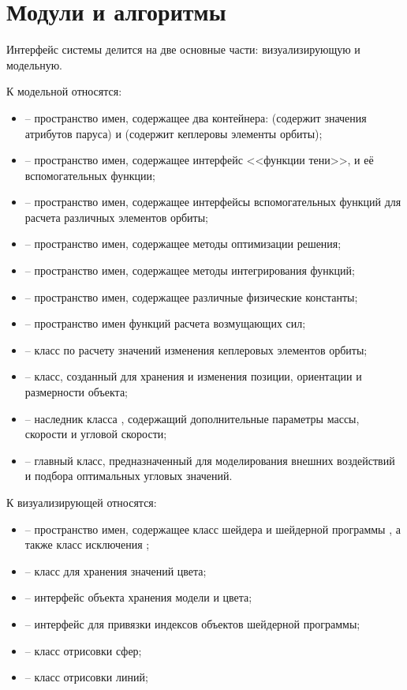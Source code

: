 \section{Модули и алгоритмы}
\noindent\indent Интерфейс системы делится на две основные части: визуализирующую и
модельную.\par
    К модельной относятся:
\begin{itemize}
    \item {} -- пространство имен, содержащее два контейнера:
     (содержит значения атрибутов паруса) и
     (содержит кеплеровы элементы орбиты);
    \item {} -- пространство имен, содержащее интерфейс <<функции тени>>,
    и её вспомогательных функции;
    \item {} -- пространство имен, содержащее интерфейсы вспомогательных
    функций для расчета различных элементов орбиты;
    \item {} -- пространство имен, содержащее методы оптимизации
    решения;
    \item {} -- пространство имен, содержащее методы интегрирования
    функций;
    \item {} -- пространство имен, содержащее различные физические
    константы;
    \item {} -- пространство имен функций расчета возмущающих сил;
    \item {} -- класс по расчету значений изменения кеплеровых
    элементов орбиты;
    \item {} -- класс, созданный для хранения и изменения
    позиции, ориентации и размерности объекта;
    \item {} -- наследник класса , содержащий дополнительные
    параметры массы, скорости и угловой скорости;
    \item {} -- главный класс, предназначенный для
    моделирования внешних воздействий и подбора оптимальных угловых значений.
\end{itemize}
    К визуализирующей относятся:
\begin{itemize}
    \item {} -- пространство имен, содержащее класс шейдера  и
    шейдерной программы , а также класс исключения ;
    \item {} -- класс для хранения значений цвета;
    \item {} -- интерфейс объекта хранения модели и цвета;
    \item {} -- интерфейс для привязки индексов объектов шейдерной
    программы;
    \item {} -- класс отрисовки сфер;
    \item {} -- класс отрисовки линий;
\end{itemize}
